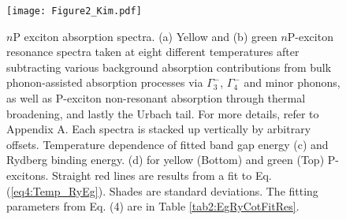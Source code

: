 \documentclass[aps,reprint,amsmath,amssymb,prb]{revtex4-1}
\begin{document}
\begin{figure}[htbp]
\centering
\texttt{[image: Figure2\_Kim.pdf]}
\caption{$n$P exciton absorption spectra. (a) Yellow and (b) green $n$P-exciton resonance spectra taken at eight different temperatures after subtracting various background absorption contributions from bulk phonon-assisted absorption processes via ${\Gamma}_3^{-}$,  ${\Gamma}_4^{-}$ and minor phonons, as well as P-exciton non-resonant absorption through thermal broadening, and lastly the Urbach tail. For more details, refer to Appendix A. Each spectra is stacked up vertically by arbitrary offsets.
Temperature dependence of fitted band gap energy (c) and Rydberg binding energy. (d) for yellow (Bottom) and green (Top) P-excitons. Straight red lines are results from a fit to Eq. (\ref{eq4:Temp_RyEg}). Shades are standard deviations. The fitting parameters from Eq. (4) are in Table \ref{tab2:EgRyCotFitRes}.
}
\label{Fig2:nPExcitonAbsorption}
\end{figure}
\end{document}
